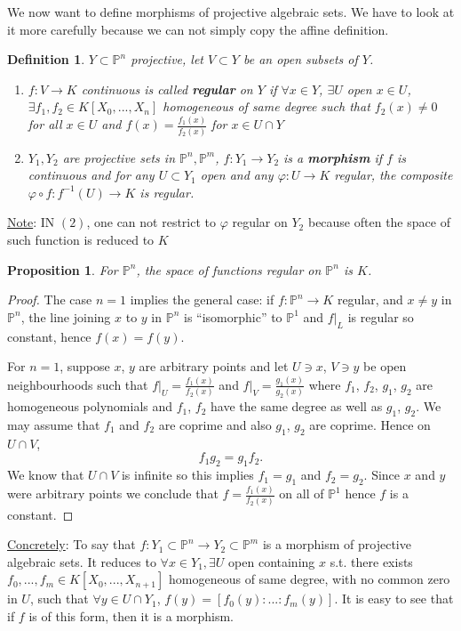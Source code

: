 \documentclass[11pt]{article}
\newtheorem{prop}[thm]{Proposition}
\newtheorem{dfn}[thm]{Definition}
\newcommand{\proj}{\mathbb P}
\newcommand{\lrta}{\longrightarrow}
\begin{document}
	We now want to define morphisms of  projective algebraic sets. We have to look at it more carefully because we can not simply copy the affine definition.
	\begin{dfn}
		$Y\subset \proj^n$ projective, let $V\subset Y $ be an open subsets of $Y$.
		\begin{enumerate}[label=(\arabic*)]
			\item $f: V\lrta K$ continuous is called \textbf{regular} on $Y$ if $\forall x\in Y$, $\exists U$ open $x\in U$, $\exists f_1,f_2\in K[X_0,...,X_n]$ homogeneous of same degree such that $f_2(x)\neq 0$ for all $x\in U$ and $f(x)=\frac{f_1(x)}{f_2(x)}$ for $x\in U\cap Y$
			\item $Y_1,Y_2$ are projective sets in $\proj^n,\proj^m$, $f: Y_1\lrta Y_2$ is a \textbf{morphism} if $f$ is continuous and for any $U\subset Y_1$ open and any $\varphi:U\lrta K$ regular, the composite $\varphi\circ f: f^{-1}(U)\lrta K$ is regular.
		\end{enumerate}
	\end{dfn}
	\underline{Note}: IN $(2)$, one can not restrict to $\varphi$ regular on $Y_2$ because often the space of such function is reduced to $K$
	\begin{prop}
		For $\proj^n$, the space of functions regular on $\proj^n$ is $K$.
	\end{prop}
	\begin{proof}
		The case $n=1$ implies the general case: if $f:\proj^n\lrta K$ regular, and $x\neq y$ in $\proj^n$, the line joining $x$ to $y$ in $\proj^n$ is ``isomorphic'' to $\proj^1$ and $f|_L$ is regular so constant, hence $f(x)=f(y)$.
		
		For $n=1$, suppose $x$, $y$ are arbitrary points and let $U \ni x$, $V\ni y$ be open neighbourhoods such that $f|_U = \frac{f_1(x)}{f_2(x)}$ and $f|_V = \frac{g_1(x)}{g_2(x)}$ where $f_1$, $f_2$, $g_1$, $g_2$ are homogeneous polynomials and $f_1$, $f_2$ have the same degree as well as $g_1$, $g_2$. We may assume that $f_1$ and $f_2$ are coprime and also $g_1$, $g_2$ are coprime. Hence on $U \cap V$,
		$$
		f_1 g_2 = g_1 f_2.
		$$
		We know that $U \cap V$ is infinite so this implies $f_1 = g_1$ and $ f_2 = g_2$. Since $x$ and $y$ were arbitrary points we conclude that $f = \frac{f_1(x)}{f_2(x)}$ on all of $\proj^1$ hence $f$ is a constant.
	\end{proof}
	\underline{Concretely}: To say that $f: Y_1\subset \proj^n\lrta Y_2\subset \proj^m$  is a morphism of projective algebraic sets. It reduces to 
	$\forall x\in Y_1,\exists U$ open containing $x$ s.t. there exists $f_0,...,f_m\in K[X_0,...,X_{n+1}]$
	homogeneous of same degree, with no common zero in $U$, such that
	$\forall y\in U\cap Y_1$, $f(y)=[f_0(y):...:f_m(y)]$. It is easy to see that if $f$ is of this form, then it is a morphism.
	
\end{document}
